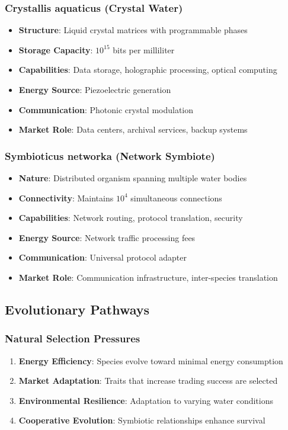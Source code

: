 \documentclass[11pt,a4paper]{article}
\begin{document}
\subsubsection{Crystallis aquaticus (Crystal Water)}
\begin{itemize}
    \item \textbf{Structure}: Liquid crystal matrices with programmable phases
    \item \textbf{Storage Capacity}: $10^{15}$ bits per milliliter
    \item \textbf{Capabilities}: Data storage, holographic processing, optical computing
    \item \textbf{Energy Source}: Piezoelectric generation
    \item \textbf{Communication}: Photonic crystal modulation
    \item \textbf{Market Role}: Data centers, archival services, backup systems
\end{itemize}

\subsubsection{Symbioticus networka (Network Symbiote)}
\begin{itemize}
    \item \textbf{Nature}: Distributed organism spanning multiple water bodies
    \item \textbf{Connectivity}: Maintains $10^4$ simultaneous connections
    \item \textbf{Capabilities}: Network routing, protocol translation, security
    \item \textbf{Energy Source}: Network traffic processing fees
    \item \textbf{Communication}: Universal protocol adapter
    \item \textbf{Market Role}: Communication infrastructure, inter-species translation
\end{itemize}

\subsection{Evolutionary Pathways}

\subsubsection{Natural Selection Pressures}
\begin{enumerate}
    \item \textbf{Energy Efficiency}: Species evolve toward minimal energy consumption
    \item \textbf{Market Adaptation}: Traits that increase trading success are selected
    \item \textbf{Environmental Resilience}: Adaptation to varying water conditions
    \item \textbf{Cooperative Evolution}: Symbiotic relationships enhance survival
\end{enumerate}
\end{document}
